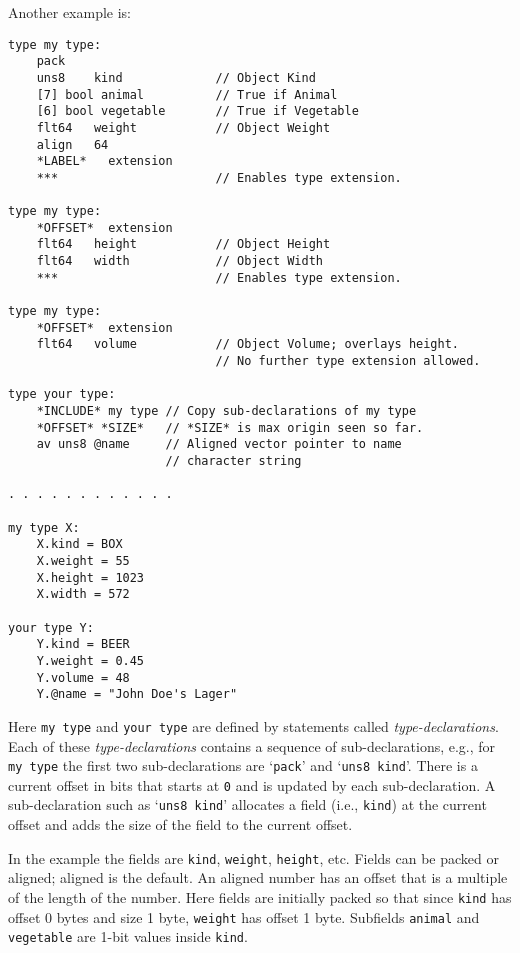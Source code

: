 \documentclass[12pt]{article}
\newenvironment{indpar}[1][0.3in]%
	{\begin{list}{}%
		     {\setlength{\itemsep}{0in}%
		      \setlength{\topsep}{0in}%
		      \setlength{\parsep}{1ex}%
		      \setlength{\labelwidth}{#1}%
		      \setlength{\leftmargin}{#1}%
		      \addtolength{\leftmargin}{\labelsep}}%
	 \item}%
	{\end{list}}
\begin{document}
Another example is:

\begin{indpar}\begin{verbatim}
type my type:
    pack
    uns8    kind             // Object Kind
    [7] bool animal          // True if Animal
    [6] bool vegetable       // True if Vegetable
    flt64   weight           // Object Weight
    align   64
    *LABEL*   extension
    ***                      // Enables type extension.

type my type:
    *OFFSET*  extension
    flt64   height           // Object Height
    flt64   width            // Object Width
    ***                      // Enables type extension.

type my type:
    *OFFSET*  extension
    flt64   volume           // Object Volume; overlays height.
                             // No further type extension allowed.

type your type:
    *INCLUDE* my type // Copy sub-declarations of my type
    *OFFSET* *SIZE*   // *SIZE* is max origin seen so far.
    av uns8 @name     // Aligned vector pointer to name
                      // character string

. . . . . . . . . . . .

my type X:
    X.kind = BOX
    X.weight = 55
    X.height = 1023
    X.width = 572

your type Y:
    Y.kind = BEER
    Y.weight = 0.45
    Y.volume = 48
    Y.@name = "John Doe's Lager"
\end{verbatim}\end{indpar}

Here {\tt my type} and {\tt your type} are defined by
statements called {\em type-declarations}.  Each of these
{\em type-declarations} contains a sequence of sub-declarations, e.g.,
for {\tt my type} the first two sub-declarations are
`{\tt pack}' and `{\tt uns8 kind}'.  There is a current
offset in bits that starts at {\tt 0} and is updated by each sub-declaration.
A sub-declaration such as `{\tt uns8 kind}' allocates a field
(i.e., {\tt kind})
at the current offset and adds the size of the field to the
current offset.

In the example the fields are {\tt kind}, {\tt weight}, {\tt height}, etc.
Fields can be packed or aligned; aligned is the default.  An aligned number has an offset
that is a multiple of the length of the number.
Here fields are initially packed
so that since {\tt kind} has offset 0 bytes and size 1 byte,
{\tt weight} has offset 1 byte.  Subfields {\tt animal}
and {\tt vegetable} are 1-bit values inside {\tt kind}.
\end{document}

